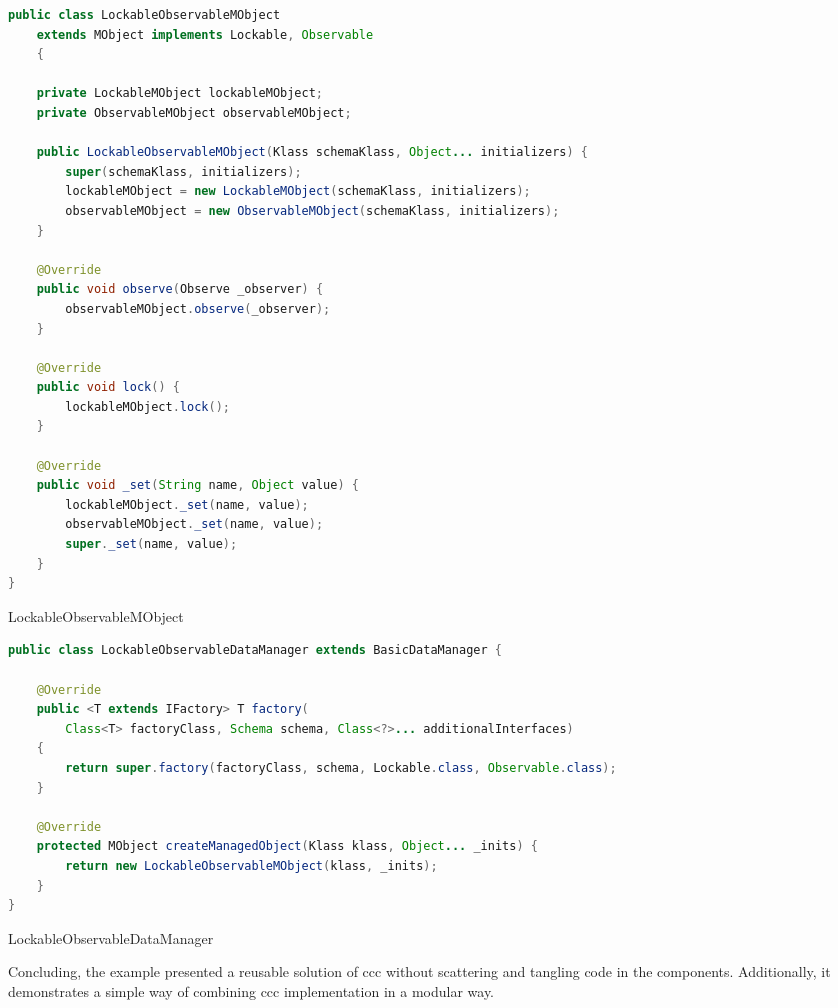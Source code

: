 \begin{sourcecode} [H]
	\begin{lstlisting}[language=Java, escapechar=|]
public class LockableObservableMObject 
	extends MObject implements Lockable, Observable 
	{

	private LockableMObject lockableMObject;
	private ObservableMObject observableMObject;

	public LockableObservableMObject(Klass schemaKlass, Object... initializers) {
		super(schemaKlass, initializers);
		lockableMObject = new LockableMObject(schemaKlass, initializers);
		observableMObject = new ObservableMObject(schemaKlass, initializers);
	}

	@Override
	public void observe(Observe _observer) {
		observableMObject.observe(_observer);
	}

	@Override
	public void lock() {
		lockableMObject.lock();
	}

	@Override
	public void _set(String name, Object value) {
		lockableMObject._set(name, value);
		observableMObject._set(name, value);
		super._set(name, value);
	}
}
	\end{lstlisting}
	\caption{LockableObservableMObject}
	\label{lst:LockableObservableMObject}
\end{sourcecode}

\begin{sourcecode} [H]
	\begin{lstlisting}[language=Java, escapechar=|]
public class LockableObservableDataManager extends BasicDataManager {

	@Override
	public <T extends IFactory> T factory(
		Class<T> factoryClass, Schema schema, Class<?>... additionalInterfaces) 
	{
		return super.factory(factoryClass, schema, Lockable.class, Observable.class);
	}

	@Override
	protected MObject createManagedObject(Klass klass, Object... _inits) {
		return new LockableObservableMObject(klass, _inits);
	}
}
	\end{lstlisting}
	\caption{LockableObservableDataManager}
	\label{lst:LockableObservableDataManager}
\end{sourcecode}

Concluding, the example presented a reusable solution of \ac{ccc} without scattering and tangling code in the components.
Additionally, it demonstrates a simple way of combining \ac{ccc} implementation in a modular way.